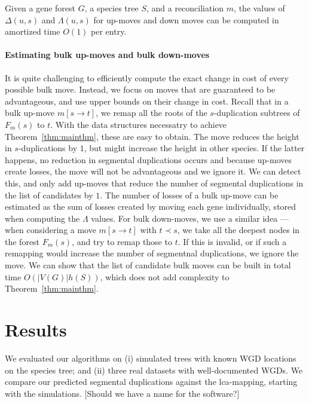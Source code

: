 \documentclass[10pt]{article}
\newcommand{\ml}[1]{\begingroup\color{blue}#1\endgroup}
\begin{document}
\begin{theorem}\label{thm:mainthm}
Given a gene forest $G$, a species tree $S$, and a reconciliation $m$, the values of $\Delta(u, s)$ and $\Lambda(u, s)$ for up-moves and down moves can be computed in amortized time $O(1)$ per entry.
\end{theorem}





\paragraph{Estimating bulk up-moves and bulk down-moves}
It is quite challenging to efficiently compute the exact change in cost of every possible bulk move.  Instead, we focus on moves that are guaranteed to be advantageous, and use upper bounds on their change in cost.
Recall that in a bulk up-move $m[s \rightarrow t]$, we remap all the roots of the $s$-duplication subtrees of $F_m(s)$ to $t$.  With the data structures necessatry to achieve Theorem~\ref{thm:mainthm}, these are easy to obtain.  The move reduces the height in $s$-duplications by $1$, but might increase the height in other species.
If the latter happens, no reduction in segmental duplications occurs and because up-moves create losses, the move will not be advantageous and we ignore it.  We can detect this, and only add up-moves that reduce the number of segmental duplications in the list of candidates by $1$.  The number of losses of a bulk up-move can be estimated as the sum of losses created by moving each gene individually, stored when computing the $\Lambda$ values.
For bulk down-moves, we use a similar idea --- when considering a move $m[s \rightarrow t]$ with $t \prec s$, we take all the deepest nodes in the forest $F_m(s)$, and try to remap those to $t$.  If this is invalid, or if such a remapping would increase the number of segmentnal duplications, we ignore the move.  We can show that the list of candidate bulk moves can be built in total time $O(|V(G)| h(S))$, which does not add complexity to Theorem~\ref{thm:mainthm}.



\section{Results}

We evaluated our algorithms on (i) simulated trees with known WGD locations on the species tree; and (ii) three real datasets with well-documented WGDs. 
We compare our predicted segmental duplications against the lca-mapping, starting with the simulations.
\ml{[Should we have a name for the software?]}
\end{document}
